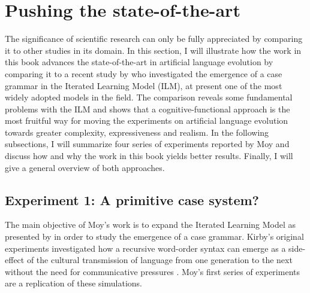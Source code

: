 \newpage
\section{Pushing the state-of-the-art}
\label{s:impact}

The significance of scientific research can only be fully appreciated by comparing it to other studies in its domain. In this section, I will illustrate how the work in this book advances the state-of-the-art in artificial language evolution by comparing it to a recent study by \citet{moy06case} who investigated the emergence of a case grammar in the Iterated Learning Model (ILM), at present one of the most widely adopted models in the field. The comparison reveals some fundamental problems with the ILM and shows that a cognitive-functional approach is the most fruitful way for moving the experiments on artificial language evolution towards greater complexity, expressiveness and realism. In the following subsections, I will summarize four series of experiments reported by Moy and discuss how and why the work in this book yields better results. Finally, I will give a general overview of both approaches.

\subsection{Experiment 1: A primitive case system?}

The main objective of Moy's work is to expand the Iterated Learning Model as presented by \citet{kirby02learning} in order to study the emergence of a case grammar. Kirby's original experiments investigated how a recursive word-order syntax can emerge as a side-effect of the cultural transmission of language from one generation to the next without the need for communicative pressures \citep[the so-called ``function independence principle'', ][]{brighton05cultural}. Moy's first series of experiments are a replication of these simulations.

\largerpage[-2]
